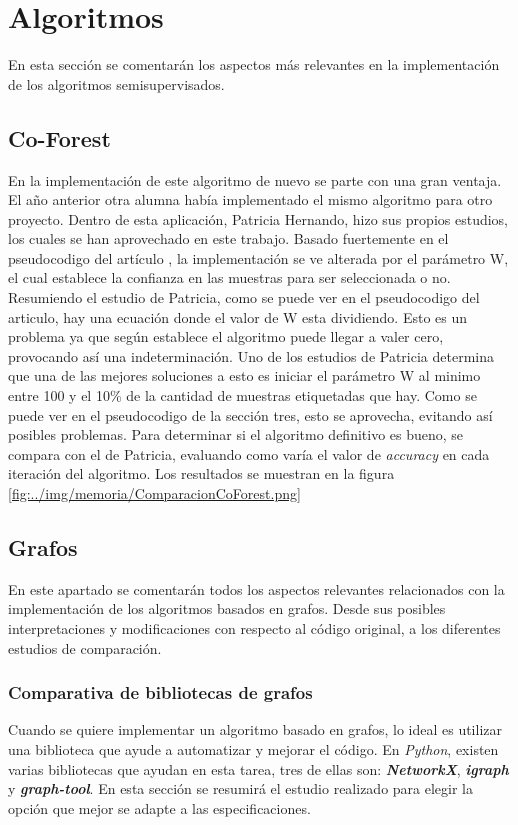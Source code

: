 \section{Algoritmos}
En esta sección se comentarán los aspectos más relevantes en la implementación de los algoritmos semisupervisados.
\subsection{Co-Forest}\label{sec5:coforest}
En la implementación de este algoritmo de nuevo se parte con una gran ventaja. El año anterior otra alumna había implementado el mismo algoritmo para otro proyecto. Dentro de esta aplicación, Patricia Hernando, hizo sus propios estudios, los cuales se han aprovechado en este trabajo.
Basado fuertemente en el pseudocodigo del artículo \cite{IEEE:CoForest}, la implementación se ve alterada por el parámetro W, el cual establece la confianza en las muestras para ser seleccionada o no. Resumiendo el estudio de Patricia, como se puede ver en el pseudocodigo del articulo, hay una ecuación donde el valor de W esta dividiendo. Esto es un problema ya que según establece el algoritmo puede llegar a valer cero, provocando así una indeterminación. Uno de los estudios de Patricia determina que una de las mejores soluciones a esto es iniciar el parámetro W al minimo entre 100 y el 10\% de la cantidad de muestras etiquetadas que hay. Como se puede ver en el pseudocodigo de la sección tres, esto se aprovecha, evitando así posibles problemas.
Para determinar si el algoritmo definitivo es bueno, se compara con el de Patricia, evaluando como varía el valor de \textit{accuracy} en cada iteración del algoritmo. Los resultados se muestran en la figura \ref{fig:../img/memoria/ComparacionCoForest.png}

\subsection{Grafos}
En este apartado se comentarán todos los aspectos relevantes relacionados con la implementación de los algoritmos basados en grafos. Desde sus posibles interpretaciones y modificaciones con respecto al código original, a los diferentes estudios de comparación.

\subsubsection{Comparativa de bibliotecas de grafos}
Cuando se quiere implementar un algoritmo basado en grafos, lo ideal es utilizar una biblioteca que ayude a automatizar y mejorar el código. En \textit{Python}, existen varias bibliotecas que ayudan en esta tarea, tres de ellas son: \textit{\textbf{NetworkX}}, \textit{\textbf{igraph}} y \textit{\textbf{graph-tool}}. En esta sección se resumirá el estudio realizado para elegir la opción que mejor se adapte a las especificaciones.

